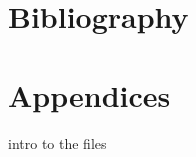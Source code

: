 \documentclass[twoside,openright,final]{bhamthesis}
\begin{document}
\newpage


\newpage


\newpage


\newpage


\newpage


\newpage


\newpage
\section*{Bibliography}
\nocite{*}



\newpage
\section*{Appendices}
\par intro to the files
\end{document}
